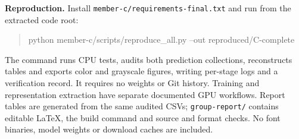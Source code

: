 \documentclass[a4paper,10pt]{article}
\begin{document}
\textbf{Reproduction.} Install \texttt{member-c/requirements-final.txt} and run from the extracted code root:
\begin{quote}\ttfamily
python member-c/scripts/reproduce\_all.py --out reproduced/C-complete
\end{quote}
The command runs CPU tests, audits both prediction collections, reconstructs tables and exports color and grayscale figures, writing per-stage logs and a verification record. It requires no weights or Git history. Training and representation extraction have separate documented GPU workflows. Report tables are generated from the same audited CSVs; \texttt{group-report/} contains editable LaTeX, the build command and source and format checks. No font binaries, model weights or download caches are included.
\end{document}

